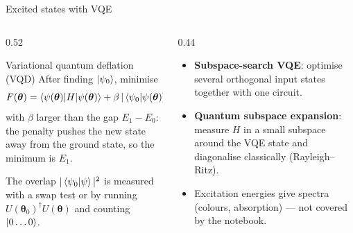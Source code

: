 \documentclass[aspectratio=169,11pt]{beamer}
\newcommand{\key}[1]{{\color{qdark}\textbf{#1}}}
\newcommand{\bt}{\boldsymbol\theta}
\begin{document}
\begin{frame}{Excited states with VQE}
  \begin{columns}[T]
    \begin{column}{0.52\textwidth}
      \begin{block}{Variational quantum deflation (VQD)}
        After finding $\ket{\psi_0}$, minimise
        \[ F(\bt) = \braket{\psi(\bt)|H|\psi(\bt)} + \beta\,|\braket{\psi_0|\psi(\bt)}|^2 \]
        with $\beta$ larger than the gap $E_1 - E_0$: the penalty pushes the new state away from the ground state, so the minimum is $E_1$.
      \end{block}
      \small The overlap $|\braket{\psi_0|\psi}|^2$ is measured with a swap test or by running $U(\bt_0)^\dagger U(\bt)$ and counting $\ket{0\dots0}$.
    \end{column}
    \begin{column}{0.44\textwidth}
      \begin{itemize}
        \item \key{Subspace-search VQE}: optimise several orthogonal input states together with one circuit.
        \item \key{Quantum subspace expansion}: measure $H$ in a small subspace around the VQE state and diagonalise classically (Rayleigh--Ritz).
        \item Excitation energies give spectra (colours, absorption) --- not covered by the notebook.
      \end{itemize}
    \end{column}
  \end{columns}
\end{frame}
\end{document}
